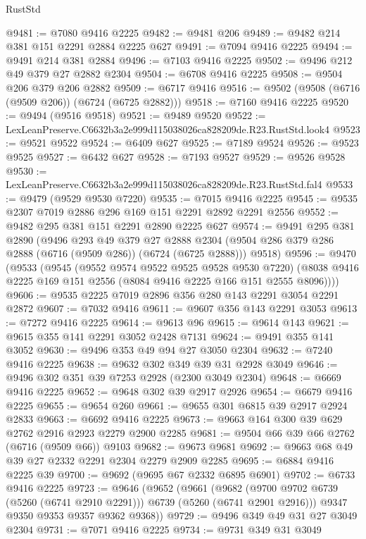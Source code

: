 \begin{lexlean}{RustStd}
\begin{coremodule}
@9481 := @7080 @9416 @2225
@9482 := @9481 @206
@9489 := @9482 @214 @381 @151 @2291 @2884 @2225 @627
@9491 := @7094 @9416 @2225
@9494 := @9491 @214 @381 @2884
@9496 := @7103 @9416 @2225
@9502 := @9496 @212 @49 @379 @27 @2882 @2304
@9504 := @6708 @9416 @2225
@9508 := @9504 @206 @379 @206 @2882
@9509 := @6717 @9416
@9516 := @9502 (@9508 (@6716 (@9509 @206)) (@6724 (@6725 @2882)))
@9518 := @7160 @9416 @2225
@9520 := @9494 (@9516 @9518)
@9521 := @9489 @9520
@9522 := LexLeanPreserve.C6632b3a2e999d115038026ca828209de.R23.RustStd.look4
@9523 := @9521 @9522
@9524 := @6409 @627
@9525 := @7189 @9524
@9526 := @9523 @9525
@9527 := @6432 @627
@9528 := @7193 @9527
@9529 := @9526 @9528
@9530 := LexLeanPreserve.C6632b3a2e999d115038026ca828209de.R23.RustStd.fal4
@9533 := @9479 (@9529 @9530 @7220)
@9535 := @7015 @9416 @2225
@9545 := @9535 @2307 @7019 @2886 @296 @169 @151 @2291 @2892 @2291 @2556
@9552 := @9482 @295 @381 @151 @2291 @2890 @2225 @627
@9574 := @9491
    @295
    @381
    @2890
    (@9496
      @293
      @49
      @379
      @27
      @2888
      @2304
      (@9504 @286 @379 @286 @2888 (@6716 (@9509 @286)) (@6724 (@6725 @2888)))
      @9518)
@9596 := @9470
    (@9533
      (@9545
        (@9552 @9574 @9522 @9525 @9528 @9530 @7220)
        (@8038 @9416 @2225 @169 @151 @2556 (@8084 @9416 @2225 @166 @151 @2555 @8096))))
@9606 := @9535 @2225 @7019 @2896 @356 @280 @143 @2291 @3054 @2291 @2872
@9607 := @7032 @9416
@9611 := @9607 @356 @143 @2291 @3053
@9613 := @7272 @9416 @2225
@9614 := @9613 @96
@9615 := @9614 @143
@9621 := @9615 @355 @141 @2291 @3052 @2428 @7131
@9624 := @9491 @355 @141 @3052
@9630 := @9496 @353 @49 @94 @27 @3050 @2304
@9632 := @7240 @9416 @2225
@9638 := @9632 @302 @349 @39 @31 @2928 @3049
@9646 := @9496 @302 @351 @39 @7253 @2928 (@2300 @3049 @2304)
@9648 := @6669 @9416 @2225
@9652 := @9648 @302 @39 @2917 @2926
@9654 := @6679 @9416 @2225
@9655 := @9654 @260
@9661 := @9655 @301 @6815 @39 @2917 @2924 @2833
@9663 := @6692 @9416 @2225
@9673 := @9663 @164 @300 @39 @629 @2762 @2916 @2923 @2279 @2900 @2285
@9681 := @9504 @66 @39 @66 @2762 (@6716 (@9509 @66)) @9103
@9682 := @9673 @9681
@9692 := @9663 @68 @49 @39 @27 @2332 @2291 @2304 @2279 @2909 @2285
@9695 := @6884 @9416 @2225 @39
@9700 := @9692 (@9695 @67 @2332 @6895 @6901)
@9702 := @6733 @9416 @2225
@9723 := @9646
    (@9652
      (@9661
        (@9682 (@9700 @9702 @6739 (@5260 (@6741 @2910 @2291))) @6739 (@5260 (@6741 @2901 @2916)))
        @9347
        @9350
        @9353
        @9357
        @9362
        @9368))
@9729 := @9496 @349 @49 @31 @27 @3049 @2304
@9731 := @7071 @9416 @2225
@9734 := @9731 @349 @31 @3049

\end{coremodule}
\end{lexlean}
